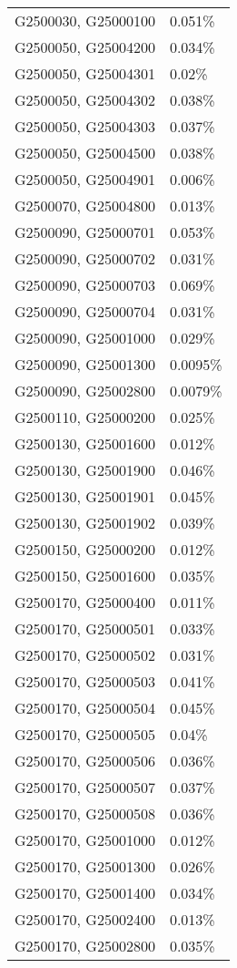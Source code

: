 \begin{longtable}[]{@{}ll@{}}
G2500030, G25000100 & 0.051\% \\
G2500050, G25004200 & 0.034\% \\
G2500050, G25004301 & 0.02\% \\
G2500050, G25004302 & 0.038\% \\
G2500050, G25004303 & 0.037\% \\
G2500050, G25004500 & 0.038\% \\
G2500050, G25004901 & 0.006\% \\
G2500070, G25004800 & 0.013\% \\
G2500090, G25000701 & 0.053\% \\
G2500090, G25000702 & 0.031\% \\
G2500090, G25000703 & 0.069\% \\
G2500090, G25000704 & 0.031\% \\
G2500090, G25001000 & 0.029\% \\
G2500090, G25001300 & 0.0095\% \\
G2500090, G25002800 & 0.0079\% \\
G2500110, G25000200 & 0.025\% \\
G2500130, G25001600 & 0.012\% \\
G2500130, G25001900 & 0.046\% \\
G2500130, G25001901 & 0.045\% \\
G2500130, G25001902 & 0.039\% \\
G2500150, G25000200 & 0.012\% \\
G2500150, G25001600 & 0.035\% \\
G2500170, G25000400 & 0.011\% \\
G2500170, G25000501 & 0.033\% \\
G2500170, G25000502 & 0.031\% \\
G2500170, G25000503 & 0.041\% \\
G2500170, G25000504 & 0.045\% \\
G2500170, G25000505 & 0.04\% \\
G2500170, G25000506 & 0.036\% \\
G2500170, G25000507 & 0.037\% \\
G2500170, G25000508 & 0.036\% \\
G2500170, G25001000 & 0.012\% \\
G2500170, G25001300 & 0.026\% \\
G2500170, G25001400 & 0.034\% \\
G2500170, G25002400 & 0.013\% \\
G2500170, G25002800 & 0.035\% \\

\end{longtable}
